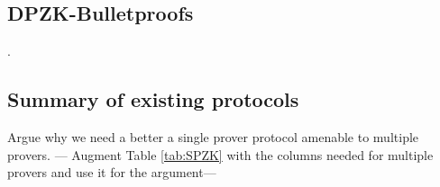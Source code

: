 
\subsection{DPZK-Bulletproofs}
.



\subsection{Summary of existing protocols}
Argue why we need a better a single prover protocol amenable to multiple provers. 
--- Augment Table \ref{tab:SPZK} with the columns needed for multiple provers and use it for the argument--- 



